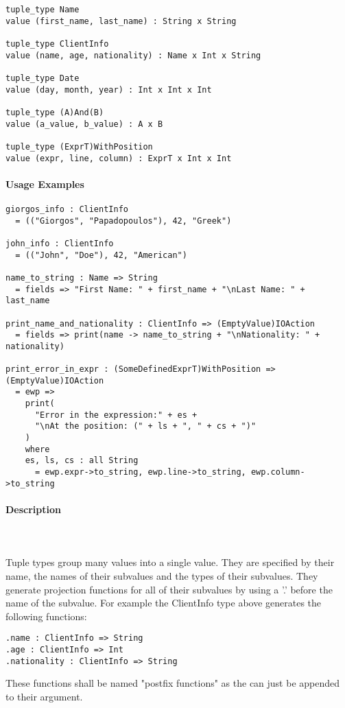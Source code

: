 \documentclass{article}
\def\pend{\mbox{} \\\\}
\begin{document}
\begin{verbatim}
tuple_type Name
value (first_name, last_name) : String x String

tuple_type ClientInfo
value (name, age, nationality) : Name x Int x String

tuple_type Date
value (day, month, year) : Int x Int x Int

tuple_type (A)And(B)
value (a_value, b_value) : A x B

tuple_type (ExprT)WithPosition
value (expr, line, column) : ExprT x Int x Int
\end{verbatim}

\paragraph{Usage Examples}

\begin{verbatim}
giorgos_info : ClientInfo
  = (("Giorgos", "Papadopoulos"), 42, "Greek")

john_info : ClientInfo
  = (("John", "Doe"), 42, "American")

name_to_string : Name => String
  = fields => "First Name: " + first_name + "\nLast Name: " + last_name

print_name_and_nationality : ClientInfo => (EmptyValue)IOAction
  = fields => print(name -> name_to_string + "\nNationality: " + nationality)

print_error_in_expr : (SomeDefinedExprT)WithPosition => (EmptyValue)IOAction
  = ewp =>
    print(
      "Error in the expression:" + es +
      "\nAt the position: (" + ls + ", " + cs + ")"
    )
    where
    es, ls, cs : all String
      = ewp.expr->to_string, ewp.line->to_string, ewp.column->to_string
\end{verbatim}

\paragraph{Description}\pend
Tuple types group many values into a single value. They are specified by their name,
the names of their subvalues and the types of their subvalues. They generate 
projection functions for all of their subvalues by using a '.' before the name of 
the subvalue. For example the ClientInfo type above generates the following 
functions:
\begin{verbatim}
.name : ClientInfo => String
.age : ClientInfo => Int
.nationality : ClientInfo => String
\end{verbatim}
These functions shall be named "postfix functions" as the can just be appended to
their argument.
\end{document}
